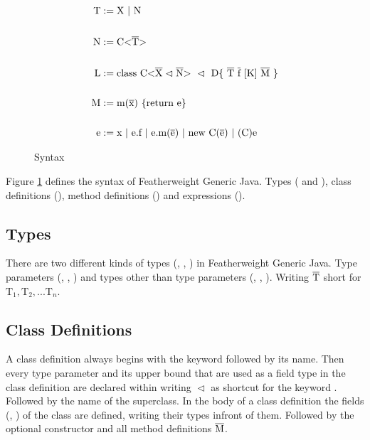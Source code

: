 \begin{figure}
    \begin{align*}
        \text{T} &:= \text{X} \ | \ \text{N}\\
        \\
        \text{N} &:= \text{C} \vv{\ot{T}}\\
        \\
        \text{L} &:= \text{class} \ \text{C} \xn \ \vartriangleleft \ \text{D} \{ \ \ot{T} \ \ot{f} \ [\text{K}] \ \ot{M} \ \}\\
        \\
        \text{M} &:= \text{m}(\ot{x}) \ \{\text{return e}\}\\
        \\
        \text{e} &:= \text{x} \ | \ \text{e.f} \ | \ \text{e.m(}\ot{e}\text{)} \ | \ \text{new C(}\ot{e}\text{)} \ | \ \text{(C)e}
    \end{align*}
    \caption{Syntax}
    \label{syntax}
\end{figure}

Figure \ref{syntax} defines the syntax of Featherweight Generic Java. Types ( and ), class definitions (), method definitions () and expressions ().

\subsection{Types}

There are two different kinds of types (, , ) in Featherweight Generic Java.
Type parameters (, , ) and types other than type parameters (, , ).
Writing $\overline{\text{T}}$ short for $\text{T}_1, \text{T}_2, ... \text{T}_n$.

\subsection{Class Definitions}

A class definition  always begins with the keyword  followed by its name. Then every type parameter and its upper bound that are used as a field type in the class definition are declared within \inl{<>} writing $\vartriangleleft$ as shortcut for the keyword .
Followed by the name of the superclass. In the body of a class definition the fields (, ) of the class are defined, writing their types infront of them. Followed by the optional constructor  and all method definitions $\overline{\text{M}}$.

